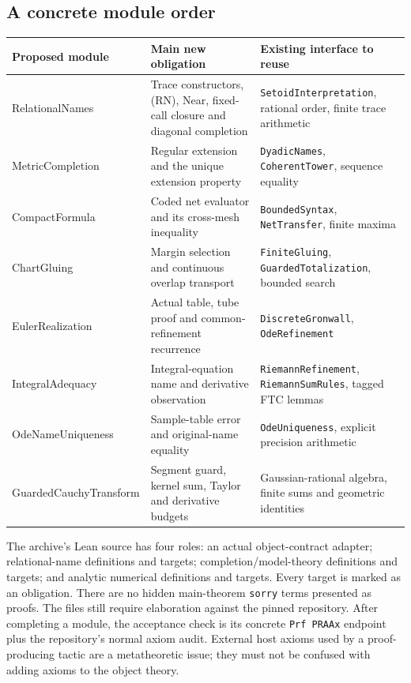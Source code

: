 \subsection{A concrete module order}

\begin{center}\small
\begin{tabularx}{\linewidth}{@{}p{.19\linewidth}XX@{}}
\toprule
Proposed module & Main new obligation & Existing interface to reuse\\
\midrule
RelationalNames & Trace constructors, (RN), Near, fixed-call closure and diagonal completion &
\texttt{SetoidInterpretation}, rational order, finite trace arithmetic\\
MetricCompletion & Regular extension and the unique extension property &
\texttt{DyadicNames}, \texttt{CoherentTower}, sequence equality\\
CompactFormula & Coded net evaluator and its cross-mesh inequality &
\texttt{BoundedSyntax}, \texttt{NetTransfer}, finite maxima\\
ChartGluing & Margin selection and continuous overlap transport &
\texttt{FiniteGluing}, \texttt{GuardedTotalization}, bounded search\\
EulerRealization & Actual table, tube proof and common-refinement recurrence &
\texttt{DiscreteGronwall}, \texttt{OdeRefinement}\\
IntegralAdequacy & Integral-equation name and derivative observation &
\texttt{RiemannRefinement}, \texttt{RiemannSumRules}, tagged FTC lemmas\\
OdeName\allowbreak Uniqueness & Sample-table error and original-name equality &
\texttt{OdeUniqueness}, explicit precision arithmetic\\
GuardedCauchy\allowbreak Transform & Segment guard, kernel sum, Taylor and derivative budgets &
Gaussian-rational algebra, finite sums and geometric identities\\
\bottomrule
\end{tabularx}
\end{center}

The archive's Lean source has four roles: an actual object-contract adapter;
relational-name definitions and targets; completion/model-theory definitions
and targets; and analytic numerical definitions and targets. Every target is
marked as an obligation. There are no hidden main-theorem \texttt{sorry}
terms presented as proofs. The files still require elaboration against the
pinned repository. After completing a module, the acceptance check is its
concrete \texttt{Prf PRAAx} endpoint plus the repository's normal axiom audit.
External host axioms used by a proof-producing tactic are a metatheoretic
issue; they must not be confused with adding axioms to the object theory.

